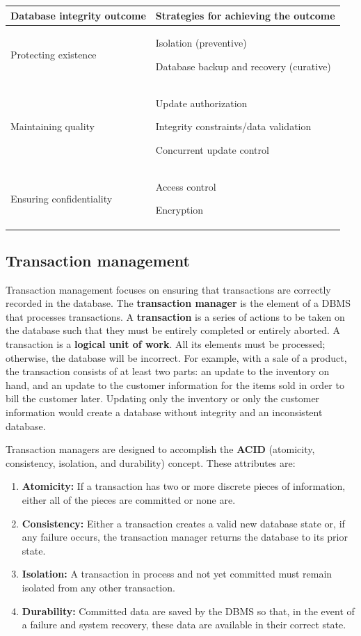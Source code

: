 \documentclass[
]{article}
\begin{document}
\begin{longtable}[]{@{}
  >{\raggedright\arraybackslash}p{}
  >{\raggedright\arraybackslash}p{}@{}}
\toprule
Database integrity outcome & Strategies for achieving the outcome \\
\midrule
\endhead
Protecting existence & Isolation (preventive)

Database backup and recovery (curative) \\
Maintaining quality & Update authorization

Integrity constraints/data validation

Concurrent update control \\
Ensuring confidentiality & Access control

Encryption \\
\bottomrule
\end{longtable}

\hypertarget{transaction-management}{%
\subsection*{Transaction management}\label{transaction-management}}

Transaction management focuses on ensuring that transactions are
correctly recorded in the database. The \textbf{transaction manager} is the
element of a DBMS that processes transactions. A \textbf{transaction} is a
series of actions to be taken on the database such that they must be
entirely completed or entirely aborted. A transaction is a \textbf{logical
unit of work}. All its elements must be processed; otherwise, the
database will be incorrect. For example, with a sale of a product, the
transaction consists of at least two parts: an update to the inventory
on hand, and an update to the customer information for the items sold in
order to bill the customer later. Updating only the inventory or only
the customer information would create a database without integrity and
an inconsistent database.

Transaction managers are designed to accomplish the \textbf{ACID} (atomicity,
consistency, isolation, and durability) concept. These attributes are:

\begin{enumerate}
\def\labelenumi{\arabic{enumi}.}
\item
  \textbf{Atomicity:} If a transaction has two or more discrete pieces of
  information, either all of the pieces are committed or none are.
\item
  \textbf{Consistency:} Either a transaction creates a valid new database
  state or, if any failure occurs, the transaction manager returns the
  database to its prior state.
\item
  \textbf{Isolation:} A transaction in process and not yet committed must
  remain isolated from any other transaction.
\item
  \textbf{Durability:} Committed data are saved by the DBMS so that, in the
  event of a failure and system recovery, these data are available in
  their correct state.
\end{enumerate}
\end{document}
